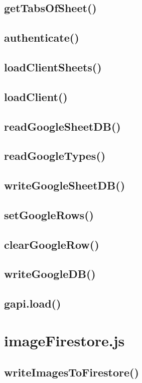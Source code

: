 \documentclass[letterpaper]{article}
\begin{document}
\subsection{getTabsOfSheet()}
\subsection{authenticate()}
\subsection{loadClientSheets()}
\subsection{loadClient()}
\subsection{readGoogleSheetDB()}
\subsection{readGoogleTypes()}
\subsection{writeGoogleSheetDB()}
\subsection{setGoogleRows()}
\subsection{clearGoogleRow()}
\subsection{writeGoogleDB()}
\subsection{gapi.load()}

\newpage

\section{imageFirestore.js}

\subsection{writeImagesToFirestore()}
\end{document}
